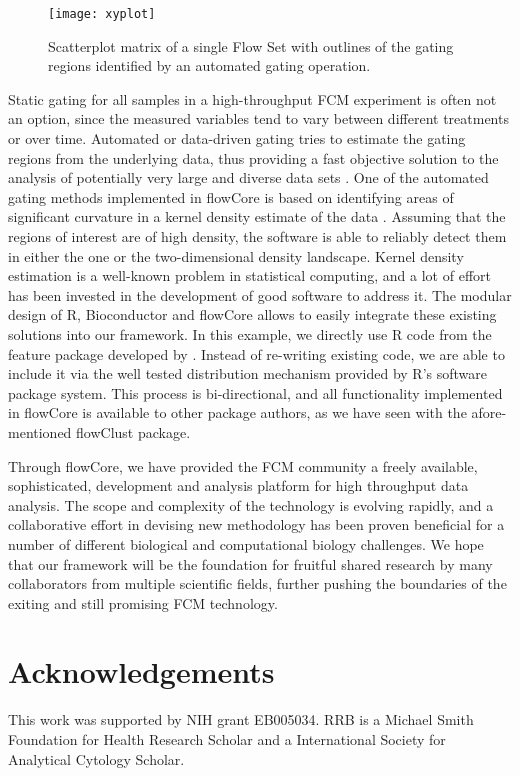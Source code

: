 \documentclass[12pt]{article}
\begin{document}
\begin{figure}[htbp]
\centering
\texttt{[image: xyplot]}
\caption{\label{xyplot}%
Scatterplot matrix of a single Flow Set with outlines of the gating
regions identified by an automated gating operation.}
\end{figure}

Static gating for all samples in a high-throughput FCM experiment is
often not an option, since the measured variables tend to vary between
different treatments or over time. Automated or data-driven gating
tries to estimate the gating regions from the underlying data, thus
providing a fast objective solution to the analysis of potentially
very large and diverse data sets \cite{lo2008agf}. One of the
automated gating methods implemented in flowCore is based on
identifying areas of significant curvature in a kernel density
estimate of the data \citep{wand2008}. Assuming that the regions of
interest are of high density, the software is able to reliably detect
them in either the one or the two-dimensional density
landscape. Kernel density estimation is a well-known problem in
statistical computing, and a lot of effort has been invested in the
development of good software to address it. The modular design of R,
Bioconductor and flowCore allows to easily integrate these existing
solutions into our framework. In this example, we directly use R code
from the feature package developed by \cite{wand2008}. Instead of
re-writing existing code, we are able to include it via the well
tested distribution mechanism provided by R's software package
system. This process is bi-directional, and all functionality
implemented in flowCore is available to other package authors, as we
have seen with the afore-mentioned flowClust package.

Through flowCore, we have provided the FCM community a freely
available, sophisticated, development and analysis platform for high
throughput data analysis. The scope and complexity of the technology
is evolving rapidly, and a collaborative effort in devising new
methodology has been proven beneficial for a number of different
biological and computational biology challenges. We hope that our
framework will be the foundation for fruitful shared research by many
collaborators from multiple scientific fields, further pushing the
boundaries of the exiting and still promising FCM technology.

\section*{Acknowledgements}
This work was supported by NIH grant EB005034. RRB is a Michael Smith
Foundation for Health Research Scholar and a International Society for
Analytical Cytology Scholar.

  
 
\end{document}
